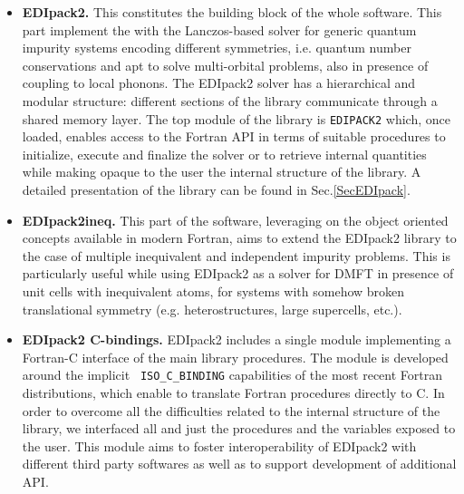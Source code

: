 \documentclass[final,3p,10pt]{elsarticle}
\def\NAME{{\rm EDIpack2 }}
\begin{document}
\begin{itemize}
\item{\bf EDIpack2.}
This constitutes the  building block of the whole software. This part
implement the  with the Lanczos-based solver for generic quantum
impurity systems encoding different symmetries, i.e. quantum number
conservations and apt to solve multi-orbital problems, also in
presence of coupling to local phonons.  
The \NAME solver has a hierarchical and modular structure: different
sections of the library communicate through a shared memory layer. The
top module of the library is {\tt EDIPACK2} which, once loaded,
enables access to the Fortran API in terms of suitable procedures to
initialize, execute and finalize the solver or to retrieve internal
quantities while making opaque to the user the internal structure of
the library. 
A detailed presentation of the library can be found in
Sec.\ref{SecEDIpack}. 


\item{\bf EDIpack2ineq.}
This part of the software, leveraging on the object oriented concepts
available in modern Fortran, aims to extend the \NAME library to the
case of multiple inequivalent and independent impurity problems. This
is particularly useful while using \NAME as a solver for DMFT in
presence of unit cells with inequivalent atoms, for systems with
somehow broken translational symmetry (e.g. heterostructures, large
supercells, etc.).


\item{\bf EDIpack2 C-bindings.}
\NAME includes a single module implementing a Fortran-C interface of the main
library procedures. The module is developed around the implicit {\tt
  ISO\_C\_BINDING} capabilities of the most recent Fortran
distributions, which enable to translate Fortran procedures directly
to C. In order to overcome all the difficulties related to the internal
structure of the library,  we interfaced all and just the
procedures and the variables exposed to the user. 
This module aims to foster interoperability of \NAME  with different
third party softwares as well as to support development of additional
API. 




\end{itemize}
\end{document}
